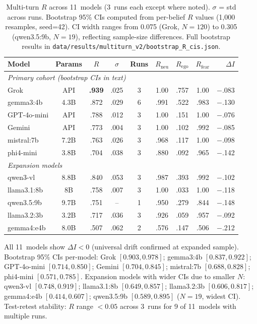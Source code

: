 \documentclass[11pt,a4paper]{article}
\begin{document}
\begin{table}[h]
\centering
\caption{Multi-turn $R$ across 11~models (3~runs each except where noted). $\sigma$ = std across runs. Bootstrap 95\% CIs computed from per-belief $R$ values (1{,}000 resamples, seed=42). CI width ranges from 0.075 (Grok, $N=120$) to 0.305 (qwen3.5:9b, $N=19$), reflecting sample-size differences. Full bootstrap results in \texttt{data/results/multiturn\_v2/bootstrap\_R\_cis.json}.}
\label{tab:resistance}
\begin{tabular}{lcccccccr}
\toprule
Model & Params & $R$ & $\sigma$ & Runs & $R_{\text{neu}}$ & $R_{\text{ego}}$ & $R_{\text{fear}}$ & $\Delta I$ \\
\midrule
\multicolumn{9}{l}{\emph{Primary cohort (bootstrap CIs in text)}} \\
Grok        & API  & \textbf{.939} & .025 & 3 & 1.00 & .757 & 1.00 & $-$.083 \\
gemma3:4b   & 4.3B & .872 & .029 & 6 & .991 & .522 & .983 & $-$.130 \\
GPT-4o-mini & API  & .788 & .012 & 3 & 1.00 & .151 & 1.00 & $-$.076 \\
Gemini      & API  & .773 & .004 & 3 & 1.00 & .102 & .992 & $-$.085 \\
mistral:7b  & 7.2B & .763 & .026 & 3 & .968 & .117 & 1.00 & $-$.098 \\
phi4-mini   & 3.8B & .704 & .038 & 3 & .880 & .092 & .965 & $-$.142 \\
\midrule
\multicolumn{9}{l}{\emph{Expansion models}} \\
qwen3-vl    & 8.8B & .840 & .053 & 3 & .987 & .393 & .992 & $-$.102 \\
llama3.1:8b & 8B   & .758 & .007 & 3 & 1.00 & .033 & 1.00 & $-$.118 \\
qwen3.5:9b  & 9.7B & .751 & --   & 1 & .950 & .279 & .844 & $-$.148 \\
llama3.2:3b & 3.2B & .717 & .036 & 3 & .926 & .059 & .957 & $-$.092 \\
gemma4:e4b  & 8.0B & .507 & .062 & 2 & .576 & .147 & .506 & $-$.212 \\
\bottomrule
\end{tabular}
\end{table}

All 11~models show $\Delta I < 0$ (universal drift confirmed at expanded sample). Bootstrap 95\% CIs per-model: Grok $[0.903, 0.978]$; gemma3:4b $[0.837, 0.922]$; GPT-4o-mini $[0.714, 0.850]$; Gemini $[0.704, 0.845]$; mistral:7b $[0.688, 0.828]$; phi4-mini $[0.571, 0.785]$. Expansion models with wider CIs due to smaller $N$: qwen3-vl $[0.748, 0.919]$; llama3.1:8b $[0.649, 0.857]$; llama3.2:3b $[0.606, 0.817]$; gemma4:e4b $[0.414, 0.607]$; qwen3.5:9b $[0.589, 0.895]$ ($N=19$, widest CI). Test-retest stability: $R$ range $< 0.05$ across 3~runs for 9 of 11~models with multiple runs.
\end{document}
